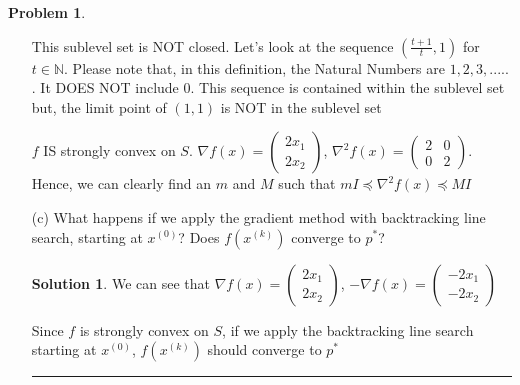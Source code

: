 \documentclass{article}
\theoremstyle{definition}
\newtheorem{problem}{Problem}
\def\fline{\rule{0.75\linewidth}{0.5pt}}
\newcommand{\finishline}{\begin{center}\fline\end{center}}
\newtheorem*{solution*}{Solution}
\newenvironment{solution}{\begin{solution*}}{{\finishline} \end{solution*}}
\begin{document}
\begin{problem}
\begin{enumerate}
    This sublevel set is NOT closed. Let's look at the sequence $(\frac{t + 1}{t}, 1)$ for $t \in \mathbb{N}$. Please note that, in this definition, the Natural Numbers are $1, 2, 3, .....$. It DOES NOT include 0.  This sequence is contained within the sublevel set but, the limit point of $(1, 1)$ is NOT in the sublevel set
    
    $f$ IS strongly convex on $S$. $\nabla f(x) = \begin{pmatrix}
2x_1 \\
2x_2
\end{pmatrix}$, $\nabla^2 f(x) = \begin{pmatrix}
2 & 0 \\
0 & 2
\end{pmatrix}$. Hence, we can clearly find an $m$ and $M$ such that $mI \preceq \nabla^2 f(x) \preceq MI$

    \item[(c)] What happens if we apply the gradient method with backtracking line search, starting at $x^{(0)}$? Does $f(x^{(k)})$ converge to $p^*$? 

    \begin{solution}
    We can see that $\nabla f(x) = \begin{pmatrix}
2x_1 \\
2x_2
\end{pmatrix}$, $-\nabla f(x) = \begin{pmatrix}
-2x_1 \\
-2x_2
\end{pmatrix}$

Since $f$ is strongly convex on $S$, if we apply the backtracking line search starting at $x^{(0)}$, $f(x^{(k)})$ should converge to $p^*$
 
    \end{solution}
\end{enumerate}

    
\end{problem}
\end{document}
